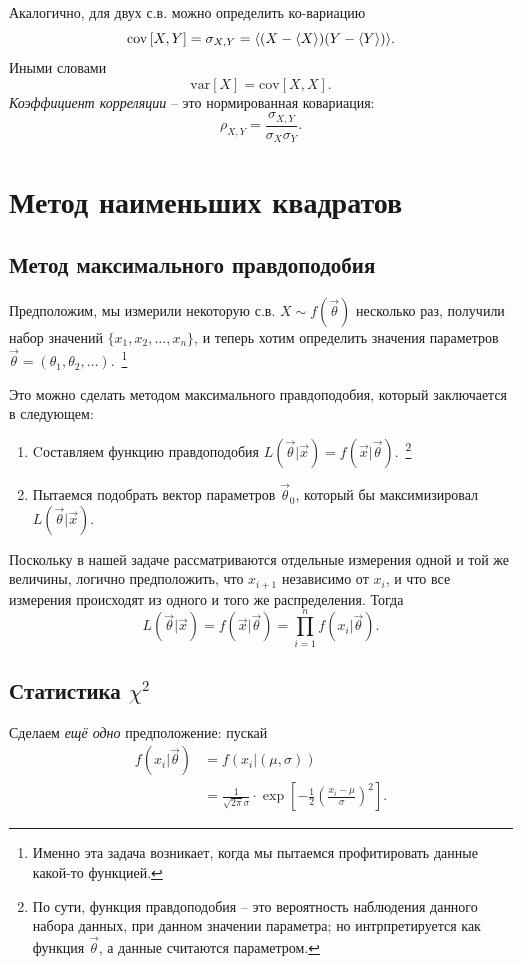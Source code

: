 \documentclass{report}
\newcommand{\var}[1]{\mathrm{var}\left[{#1}\right]}
\newcommand{\cov}[1]{\mathrm{cov}\left[{#1}\right]}
\begin{document}
Акалогично, для двух с.в. можно определить ко-вариацию
\[
\cov{X, Y} = \sigma_{X,Y} = \avg{(X-\avg{X})(Y-\avg{Y})}.
\]
Иными словами
\[
\var{X} = \cov{X,X}.
\]
\emph{Коэффициент корреляции} -- это нормированная ковариация:
\[
\rho_{X,Y} = \frac{\sigma_{X,Y}}{\sigma_X\sigma_Y}.
\]
\section{Метод наименьших квадратов}
\subsection{Метод максимального правдоподобия}
Предположим, мы измерили некоторую с.в. $X\sim f(\vec \theta)$ несколько раз, получили набор значений $\{x_1, x_2,\dots,x_n\}$, и теперь хотим определить значения параметров $\vec\theta = (\theta_1, \theta_2, \dots)$.~\footnote{Именно эта задача возникает, когда мы пытаемся профитировать данные какой-то функцией.}

Это можно сделать методом максимального правдоподобия, который заключается в следующем:
\begin{enumerate}
	\item Cоставляем функцию правдоподобия $L(\vec\theta|\vec x) = f(\vec x|\vec\theta)$.~\footnote{По сути, функция правдоподобия -- это вероятность наблюдения данного набора данных, при данном значении параметра; но интрпретируется как функция $\vec\theta$, а данные считаются параметром.}
	\item  Пытаемся подобрать вектор параметров $\vec\theta_0$, который бы максимизировал $L(\vec\theta|\vec x)$.
\end{enumerate}

\begin{rmk}
	Поскольку в нашей задаче рассматриваются отдельные измерения одной и той же величины, логично предположить, что $x_{i+1}$ независимо от $x_i$, и что все измерения происходят из одного и того же распределения. Тогда 
	\[
	L(\vec\theta|\vec x) = f(\vec x|\vec\theta) = \prod_{i=1}^n f(x_i|\vec\theta).
	\]
\end{rmk}

\subsection{Статистика $\chi^2$}
Сделаем \emph{ещё одно} предположение: пускай 
\begin{align*}
f(x_i|\vec\theta) &= f(x_i|(\mu,\sigma)) \\
&= \frac{1}{\sqrt{2\pi}\sigma}\cdot \exp\left[-\frac12\left(\frac{x_i-\mu}{\sigma}\right)^2\right].
\end{align*}
\end{document}
